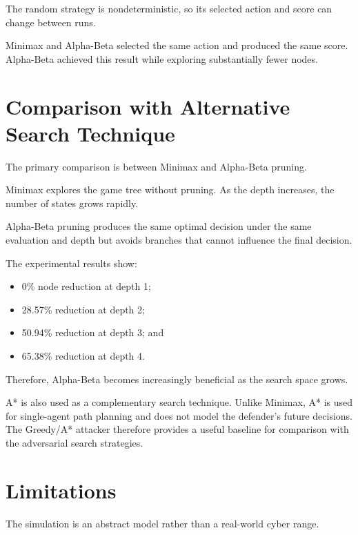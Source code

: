 \documentclass[12pt,a4paper]{article}
\begin{document}
The random strategy is nondeterministic, so its selected action and score can
change between runs.

Minimax and Alpha-Beta selected the same action and produced the same score.
Alpha-Beta achieved this result while exploring substantially fewer nodes.


\section{Comparison with Alternative Search Technique}

The primary comparison is between Minimax and Alpha-Beta pruning.

Minimax explores the game tree without pruning. As the depth increases, the
number of states grows rapidly.

Alpha-Beta pruning produces the same optimal decision under the same
evaluation and depth but avoids branches that cannot influence the final
decision.

The experimental results show:

\begin{itemize}
    \item 0\% node reduction at depth 1;
    \item 28.57\% reduction at depth 2;
    \item 50.94\% reduction at depth 3; and
    \item 65.38\% reduction at depth 4.
\end{itemize}

Therefore, Alpha-Beta becomes increasingly beneficial as the search space
grows.

A* is also used as a complementary search technique. Unlike Minimax, A* is
used for single-agent path planning and does not model the defender's future
decisions. The Greedy/A* attacker therefore provides a useful baseline for
comparison with the adversarial search strategies.


\section{Limitations}

The simulation is an abstract model rather than a real-world cyber range.
\end{document}
